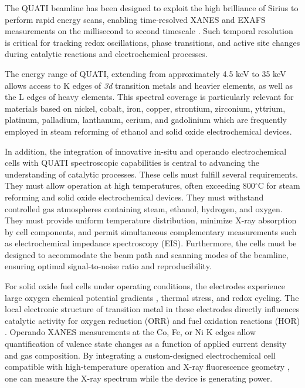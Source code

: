 The QUATI beamline has been designed to exploit the high brilliance of Sirius to perform rapid energy scans, enabling time-resolved XANES and EXAFS measurements on the millisecond to second timescale \cite{Santiago2023}. Such temporal resolution is critical for tracking redox oscillations, phase transitions, and active site changes during catalytic reactions and electrochemical processes.

The energy range of QUATI, extending from approximately 4.5 keV to 35 keV allows access to K edges of {\it 3d} transition metals and heavier elements, as well as the L edges of heavy elements. This spectral coverage is particularly relevant for materials based on nickel, cobalt, iron, copper, strontium, zirconium, yttrium, platinum, palladium, lanthanum, cerium, and gadolinium which are frequently employed in steam reforming of ethanol and solid oxide electrochemical devices.

In addition, the integration of innovative in-situ and operando electrochemical cells with QUATI spectroscopic capabilities is central to advancing the understanding of catalytic processes. These cells must fulfill several requirements. They must allow operation at high temperatures, often exceeding 800$^\circ$C for steam reforming and solid oxide electrochemical devices. They must withstand controlled gas atmospheres containing steam, ethanol, hydrogen, and oxygen. They must provide uniform temperature distribution, minimize X-ray absorption by cell components, and permit simultaneous complementary measurements such as electrochemical impedance spectroscopy (EIS). Furthermore, the cells must be designed to accommodate the beam path and scanning modes of the beamline, ensuring optimal signal-to-noise ratio and reproducibility.

For solid oxide fuel cells under operating conditions, the electrodes experience large oxygen chemical potential gradients \cite{Takashi2017}, thermal stress, and redox cycling. The local electronic structure of transition metal in these electrodes directly influences catalytic activity for oxygen reduction (ORR) and fuel oxidation reactions (HOR) \cite{Takashi2017,CHENG2023}. Operando XANES measurements at the Co, Fe, or Ni K edges allow quantification of valence state changes as a function of applied current density and gas composition. By integrating a custom-designed electrochemical cell compatible with high-temperature operation and X-ray fluorescence geometry \cite{Seval2021,Yoichiro2020}, one can measure the X-ray spectrum while the device is generating power.


